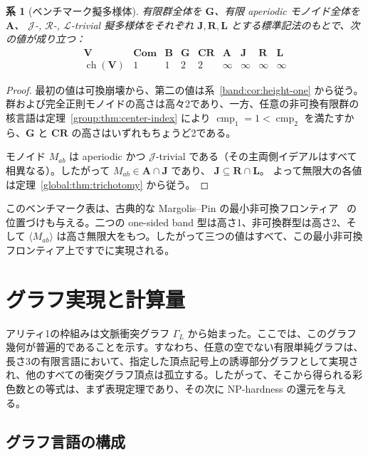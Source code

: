 \documentclass[10pt,a4paper]{ltjsarticle}
\newtheorem{corollary}[theorem]{系}
\theoremstyle{definition}
\theoremstyle{remark}
\newcommand{\cmp}{\operatorname{cmp}}
\begin{document}
\begin{corollary}[ベンチマーク擬多様体]
\label{global:cor:benchmarks}
有限群全体を \(\mathbf G\)、有限 aperiodic モノイド全体を \(\mathbf A\)、
$\mathcal J$-, $\mathcal R$-, $\mathcal L$-trivial 擬多様体をそれぞれ
\(\mathbf J,\mathbf R,\mathbf L\)
とする標準記法のもとで、次の値が成り立つ：
\[
\begin{array}{c|cccccccc}
\mathbf V
&\mathbf{Com}&\mathbf B&\mathbf G&\mathbf{CR}
&\mathbf A&\mathbf J&\mathbf R&\mathbf L\\
\hline
\operatorname{ch}(\mathbf V)
&1&1&2&2&\infty&\infty&\infty&\infty
\end{array}
\]
\end{corollary}

\begin{proof}
最初の値は可換崩壊から、第二の値は系~\ref{band:cor:height-one} から従う。群および完全正則モノイドの高さは高々2であり、一方、任意の非可換有限群の核言語は定理~\ref{group:thm:center-index} により
\(\cmp_1=1<\cmp_2\)
を満たすから、$\mathbf G$ と $\mathbf{CR}$ の高さはいずれもちょうど2である。

モノイド $M_{ab}$ は aperiodic かつ $\mathcal J$-trivial である（その主両側イデアルはすべて相異なる）。したがって
\(M_{ab}\in\mathbf A\cap\mathbf J\)
であり、
\(\mathbf J\subseteq\mathbf R\cap\mathbf L\)。
よって無限大の各値は定理~\ref{global:thm:trichotomy} から従う。
\end{proof}

このベンチマーク表は、古典的な Margolis--Pin の最小非可換フロンティア~\cite{MargolisPin1984} の位置づけも与える。二つの one-sided band 型は高さ1、非可換群型は高さ2、そして
\(\langle M_{ab}\rangle\)
は高さ無限大をもつ。したがって三つの値はすべて、この最小非可換フロンティア上ですでに実現される。


\section{グラフ実現と計算量}
\label{sec:graph-universality}

アリティ1の枠組みは文脈衝突グラフ \(\Gamma_L\) から始まった。ここでは、このグラフ幾何が普遍的であることを示す。すなわち、任意の空でない有限単純グラフは、長さ3の有限言語において、指定した頂点記号上の誘導部分グラフとして実現され、他のすべての衝突グラフ頂点は孤立する。したがって、そこから得られる彩色数との等式は、まず表現定理であり、その次に NP-hardness の還元を与える。

\subsection{グラフ言語の構成}
\end{document}
